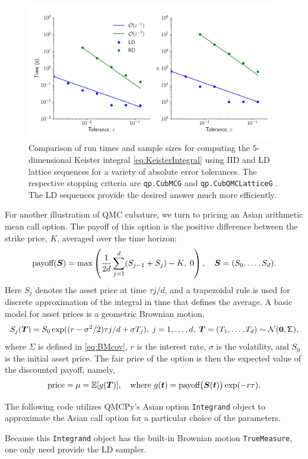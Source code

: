 \documentclass[graybox,footinfo]{svmult}
\newcommand{\mSigma}{\mathsf{\Sigma}}
\begin{document}
\begin{figure}[t]
	\includegraphics[height=6cm]{QMCSoftwareArticle/figs/sc_comp.png}
	\caption{Comparison of run times and sample sizes for computing the $5$-dimensional Keister integral \eqref{eq:KeisterIntegral} using IID and LD lattice sequences for a variety of absolute error tolerances. The respective stopping criteria are  \texttt{qp.CubMCG} \cite{HicEtal14a} and  \texttt{qp.CubQMCLatticeG} \cite{JimHic16a}. The LD sequences provide the desired answer much more efficiently.}
	\label{fig:sc_comp}
\end{figure}

For another illustration of QMC cubature, we turn to pricing an Asian arithmetic mean call option. The payoff of this option is the positive difference between the strike price, $K$, averaged over the time horizon: 
$$
\text{payoff}({\boldsymbol{S}}) = \max\left(\frac{1}{2d}\sum_{j=1}^d (S_{j-1}+S_j)-K, \; 0\right), \quad {\boldsymbol{S}} = (S_0, \ldots, S_d).
$$
Here $S_j$ denotes the asset price at time $\tau j/d$, and a trapezoidal rule is used for discrete approximation of the integral in time that defines the average.  A basic model for asset prices is a geometric Brownian motion, 
\[
S_j(\bsT) = S_0 \exp((r - \sigma^2/2) \tau j/d + \sigma T_j),   \;  j = 1, \ldots, d, \; \bsT = (T_1, \ldots, T_d)\sim \calN(\bszero,\mSigma),
\]
where $\mSigma$ is defined in \eqref{eq:BMcov}, $r$ is the interest rate, $\sigma$ is the volatility, and $S_0$ is the initial asset price.  The fair price of the option is then the expected value of the discounted payoff, namely,
\begin{equation*}
	\text{price} = \mu = {\mathbb{E}}[g({\boldsymbol{T}})], \quad \text{where } g({\boldsymbol{t}}) = \text{payoff}\bigl({\boldsymbol{S}}({\boldsymbol{t}}) \bigr) \exp(-r \tau).
\end{equation*}

The following code utilizes QMCPy's Asian option \texttt{Integrand} object to approximate the Asian call option for a particular choice of the parameters.

Because this \texttt{Integrand} object has the built-in Brownian motion \texttt{TrueMeasure}, one only need provide the LD sampler.
\end{document}
